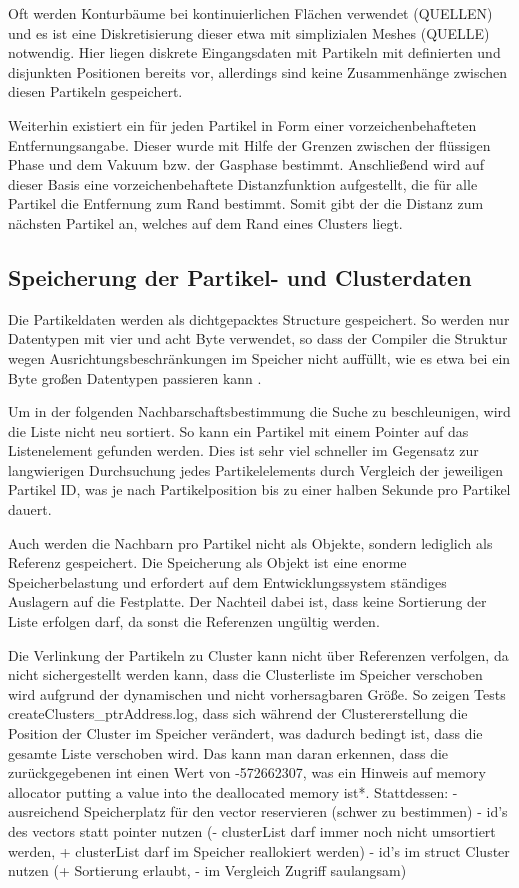 Oft werden Konturbäume bei kontinuierlichen Flächen verwendet (QUELLEN) und es ist eine Diskretisierung dieser etwa mit simplizialen Meshes (QUELLE) notwendig. Hier liegen diskrete Eingangsdaten mit Partikeln mit definierten und disjunkten Positionen bereits vor, allerdings sind keine Zusammenhänge zwischen diesen Partikeln gespeichert.

Weiterhin existiert ein  für jeden Partikel in Form einer vorzeichenbehafteten Entfernungsangabe. Dieser wurde mit Hilfe der Grenzen zwischen der flüssigen Phase und dem Vakuum bzw. der Gasphase bestimmt. Anschließend wird auf dieser Basis eine vorzeichenbehaftete Distanzfunktion aufgestellt, die für alle Partikel die Entfernung zum Rand bestimmt. Somit gibt der  die Distanz zum nächsten Partikel an, welches auf dem Rand eines Clusters liegt.

\subsection{Speicherung der Partikel- und Clusterdaten}

Die Partikeldaten werden als dichtgepacktes Structure gespeichert. So werden nur Datentypen mit vier und acht Byte verwendet, so dass der Compiler die Struktur wegen Ausrichtungsbeschränkungen im Speicher nicht auffüllt, wie es etwa bei ein Byte großen Datentypen passieren kann \cite{raymond1994cAlignment}.

Um in der folgenden Nachbarschaftsbestimmung die Suche zu beschleunigen, wird die Liste nicht neu sortiert. So kann ein Partikel mit einem Pointer auf das Listenelement gefunden werden. Dies ist sehr viel schneller im Gegensatz zur langwierigen Durchsuchung jedes Partikelelements durch Vergleich der jeweiligen Partikel ID, was je nach Partikelposition bis zu einer halben Sekunde pro Partikel dauert.

Auch werden die Nachbarn pro Partikel nicht als Objekte, sondern lediglich als Referenz gespeichert. Die Speicherung als Objekt ist eine enorme Speicherbelastung und erfordert auf dem Entwicklungssystem ständiges Auslagern auf die Festplatte. Der Nachteil dabei ist, dass keine Sortierung der Liste erfolgen darf, da sonst die Referenzen ungültig werden.

Die Verlinkung der Partikeln zu Cluster kann nicht über Referenzen verfolgen, da nicht sichergestellt werden kann, dass die Clusterliste im Speicher verschoben wird aufgrund der dynamischen und nicht vorhersagbaren Größe. So zeigen Tests createClusters\_ptrAddress.log, dass sich während der Clustererstellung die Position der Cluster im Speicher verändert, was dadurch bedingt ist, dass die gesamte Liste verschoben wird. Das kann man daran erkennen, dass die zurückgegebenen int einen Wert von -572662307, was ein Hinweis auf memory allocator putting a value into the deallocated memory ist*. Stattdessen:
- ausreichend Speicherplatz für den vector reservieren (schwer zu bestimmen)
- id's des vectors statt pointer nutzen (- clusterList darf immer noch nicht umsortiert werden, + clusterList darf im Speicher reallokiert werden)
- id's im struct Cluster nutzen (+ Sortierung erlaubt, - im Vergleich Zugriff saulangsam)

